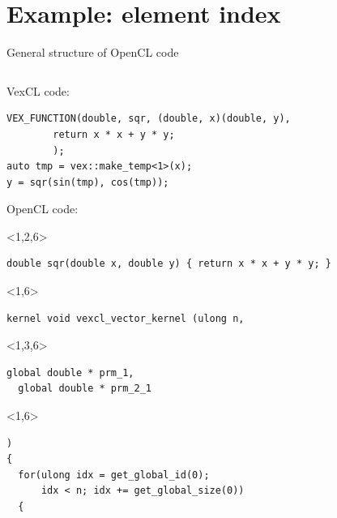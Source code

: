 \documentclass[@BEAMER_OPTIONS@]{beamer}
\begin{document}
\section{Example: element index}
\begin{frame}[fragile,shrink=10]{General structure of OpenCL code}
    \begin{columns}
        \begin{column}{0.55\textwidth}
            \vspace{-0.5\baselineskip}
            \begin{exampleblock}{VexCL code:}
                    \begin{lstlisting}
VEX_FUNCTION(double, sqr, (double, x)(double, y),
        return x * x + y * y;
        );
auto tmp = vex::make_temp<1>(x);
y = sqr(sin(tmp), cos(tmp));
                    \end{lstlisting}
            \end{exampleblock}
            \begin{exampleblock}{OpenCL code:}
                \begin{uncoverenv}<1,2,6>
                    \begin{lstlisting}
double sqr(double x, double y) { return x * x + y * y; }
                    \end{lstlisting}
                \end{uncoverenv}
                \begin{uncoverenv}<1,6>
                    \begin{lstlisting}[firstnumber=last]
kernel void vexcl_vector_kernel (ulong n,
            \end{lstlisting}
        \end{uncoverenv}
        \begin{uncoverenv}<1,3,6>
            \begin{lstlisting}[firstnumber=last]
  global double * prm_1,
  global double * prm_2_1
            \end{lstlisting}
        \end{uncoverenv}
        \begin{uncoverenv}<1,6>
            \begin{lstlisting}[firstnumber=last]
)
{
  for(ulong idx = get_global_id(0);
      idx < n; idx += get_global_size(0))
  {
                    \end{lstlisting}
                \end{uncoverenv}

\end{exampleblock}
\end{column}
\end{columns}
\end{frame}
\end{document}
